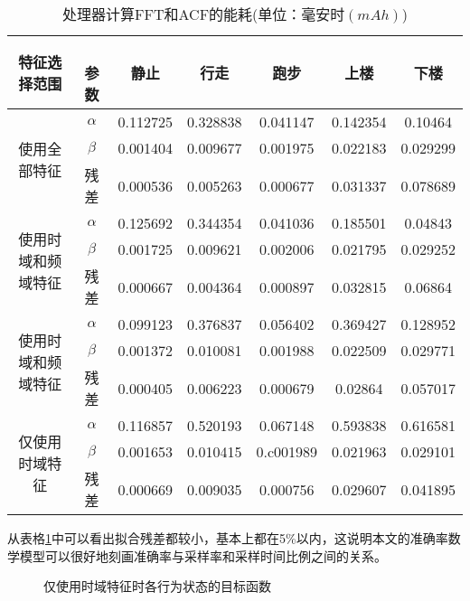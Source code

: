\begin{table}[htb]
    \centering
    \caption{处理器计算FFT和ACF的能耗(单位：毫安时$(mAh)$)}\label{fit_result}
    \begin{tabular}{ccccccc}
    \toprule
    特征选择范围 & 　参数 & 静止 & 行走 & 跑步 & 上楼 & 下楼\\
    \midrule
    \multirow{3}{2cm}{使用全部特征} & $\alpha$ & 0.112725 & 0.328838 & 0.041147 & 0.142354 & 0.10464 \\
    & $\beta$ & 0.001404 & 0.009677 & 0.001975 & 0.022183 & 0.029299 \\
    & 残差 & 0.000536 & 0.005263 & 0.000677 & 0.031337 & 0.078689 \\
    \midrule
    \multirow{3}{2cm}{使用时域和频域特征} & $\alpha$ & 0.125692 & 0.344354 & 0.041036 & 0.185501 & 0.04843 \\
    & $\beta$ & 0.001725 & 0.009621 & 0.002006 & 0.021795 & 0.029252 \\
    & 残差 & 0.000667 & 0.004364 & 0.000897 & 0.032815 & 0.06864 \\
    \midrule
    \multirow{3}{2cm}{使用时域和频域特征} & $\alpha$ & 0.099123 & 0.376837 & 0.056402 & 0.369427 & 0.128952 \\
    & $\beta$ & 0.001372 & 0.010081 & 0.001988 & 0.022509 & 0.029771 \\
    & 残差 & 0.000405 & 0.006223 & 0.000679 & 0.02864 & 0.057017 \\
    \midrule
    \multirow{3}{2cm}{仅使用时域特征}  & $\alpha$ & 0.116857 & 0.520193 & 0.067148 & 0.593838 & 0.616581 \\
    & $\beta$ & 0.001653 & 0.010415 & 0.c001989 & 0.021963 & 0.029101 \\
    & 残差 & 0.000669 & 0.009035 & 0.000756 & 0.029607 & 0.041895 \\
    \bottomrule
    \end{tabular}
\end{table}
\par 从表格\ref{fit_result}中可以看出拟合残差都较小，基本上都在5\%以内，这说明本文的准确率数学模型可以很好地刻画准确率与采样率和采样时间比例之间的关系。

\begin{figure}[!htb]
    \centering
    \caption{仅使用时域特征时各行为状态的目标函数}\label{object_function}
\end{figure}

